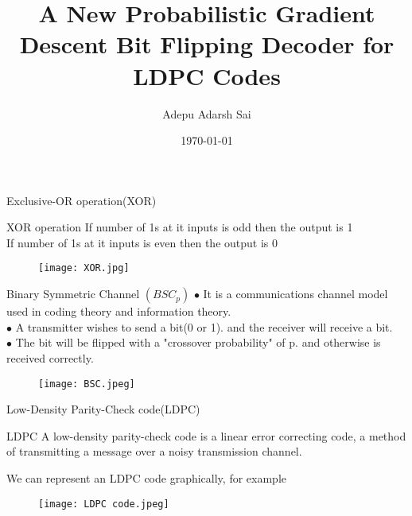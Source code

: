 \documentclass{beamer}
\title{A New Probabilistic Gradient Descent Bit Flipping Decoder for LDPC Codes}
\author{Adepu Adarsh Sai}
\institute{IITH(AI)}
\date{\today}
\providecommand{\brak}[1]{\ensuremath{\left(#1\right)}}
\begin{document}
\begin{frame}
\titlepage
\end{frame}
\begin{frame}{Exclusive-OR operation(XOR)}
\begin{block}{XOR operation}
 If number of 1s at it inputs is odd then the output is 1\\
 If number of 1s at it inputs is even then the output is 0
 \end{block}
 \begin{figure}[h]
    \centering
    \texttt{[image: XOR.jpg]}
\end{figure}    
\end{frame}
\begin{frame}{Binary Symmetric Channel $\brak{BSC_{p}}$}
$\bullet$ It is a communications channel model used in   coding theory and information theory.\\
$\bullet$ A transmitter wishes to send a bit(0 or 1). and the receiver will receive a bit.\\
$\bullet$ The bit will be flipped with a "crossover probability" of p. and otherwise is received correctly.
\begin{figure}[h]
    \centering
    \texttt{[image: BSC.jpeg]}
\end{figure}
\end{frame}
\begin{frame}{Low-Density Parity-Check code(LDPC)}
    \begin{block}{LDPC}
    A low-density parity-check code is a linear error correcting code, a method of transmitting a message over a noisy transmission channel.
    \end{block}
    We can represent an LDPC code graphically, for example
    \begin{figure}[h]
    \centering
    \texttt{[image: LDPC code.jpeg]}
\end{figure}
\end{frame}
\end{document}
